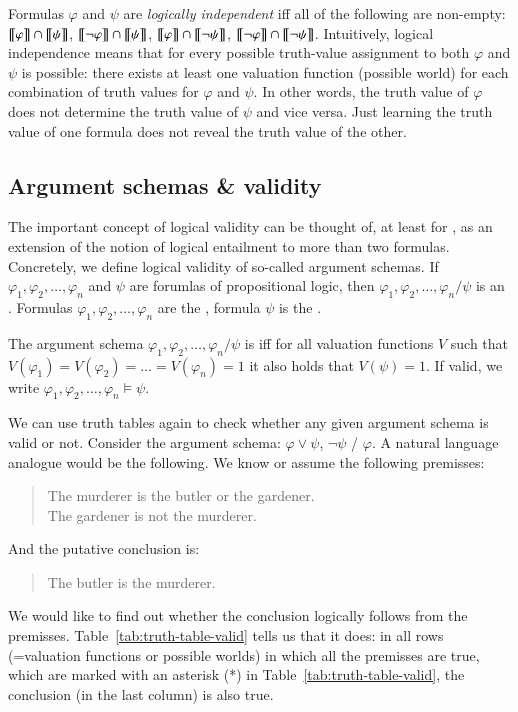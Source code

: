 \documentclass[nobib,nofonts]{tufte-handout}
\newcommand{\proplog}{\acro{PropLog}}
\begin{document}
Formulas $\varphi$ and $\psi$ are \emph{logically independent} iff all of the following are non-empty:
$\left [\! \left [ \varphi \right ]\! \right] \cap \left [\! \left [ \psi \right ]\! \right]$,
$\left [\! \left [ \neg \varphi \right ]\! \right] \cap \left [\! \left [ \psi \right ]\! \right]$,
$\left [\! \left [ \varphi \right ]\! \right] \cap \left [\! \left [ \neg \psi \right ]\! \right]$,
$\left [\! \left [ \neg \varphi \right ]\! \right] \cap \left [\! \left [ \neg \psi \right ]\! \right]$.
Intuitively, logical independence means that for every possible truth-value assignment to both $\varphi$ and $\psi$ is possible: there exists at least one valuation function (possible world) for each combination of truth values for $\varphi$ and $\psi$.
In other words, the truth value of $\varphi$ does not determine the truth value of $\psi$ and vice versa.
Just learning the truth value of one formula does not reveal the truth value of the other.


\subsection{Argument schemas \& validity}

The important concept of logical validity can be thought of, at least for \proplog, as an extension of the notion of logical entailment to more than two formulas.
Concretely, we define logical validity of so-called argument schemas.
If $\varphi_1, \varphi_2, \dots, \varphi_n$ and $\psi$ are forumlas of propositional logic, then $\varphi_1, \varphi_2, \dots, \varphi_n / \psi$ is an .
Formulas $\varphi_1, \varphi_2, \dots, \varphi_n$ are the , formula $\psi$ is the .

The argument schema $\varphi_1, \varphi_2, \dots, \varphi_n / \psi$ is  iff for all
valuation functions $V$ such that $V(\varphi_1)=V(\varphi_2)= \dots = V(\varphi_n)=1$ it also holds
that $V(\psi) = 1$.
If valid, we write $\varphi_1, \varphi_2, \dots, \varphi_n \models \psi$.

We can use truth tables again to check whether any given argument schema is valid or not.
Consider the argument schema: $\varphi \vee \psi$, $\neg \psi$ / $\varphi$.
A natural language analogue would be the following.
We know or assume the following premisses:
\begin{quote}
  The murderer is the butler or the gardener. \\
  The gardener is not the murderer.
\end{quote}
And the putative conclusion is:
\begin{quote}
  The butler is the murderer.
\end{quote}
We would like to find out whether the conclusion logically follows from the premisses.
Table~\ref{tab:truth-table-valid} tells us that it does: in all rows (=valuation functions or possible worlds) in which all the premisses are true, which are marked with an asterisk (*) in Table~\ref{tab:truth-table-valid}, the conclusion (in the last column) is also true.
\end{document}
